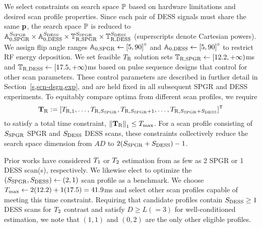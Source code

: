 We select constraints 
on search space $\mathbb{P}$ based 
on hardware limitations 
and desired scan profile properties. 
Since each pair of DESS signals 
must share the same $\mathbf{p}$, 
the search space $\mathbb{P}$ is reduced to 
$\mathbb{A}_{0,\mathrm{SPGR}}^{S_{\mathrm{SPGR}}} \times \mathbb{A}_{0,\mathrm{DESS}}^{S_{\mathrm{DESS}}} \times \mathbb{T}_{\mathrm{R,SPGR}}^{S_{\mathrm{SPGR}}} \times \mathbb{T}_{\mathrm{R,DESS}}^{S_{\mathrm{DESS}}}$ 
(superscripts denote Cartesian powers). 
We assign flip angle ranges 
$\setAs \gets \brac{5, 90}^\circ$ 
and $\setAd \gets \brac{5, 90}^\circ$
to restrict RF energy deposition. 
We set feasible $T_\mathrm{R}$ solution sets 
$\mathbb{T}_{\mathrm{R,SPGR}} \gets [12.2, +\infty)$ms 
and $\mathbb{T}_{\mathrm{R,DESS}} \gets [17.5, +\infty)$ms 
based on pulse sequence designs 
that control for other scan parameters. 
These control parameters are described 
in further detail in Section~\ref{s,scn-dsgn,exp}, 
and are held fixed 
in all subsequent SPGR and DESS experiments. 
To equitably compare optima 
from different scan profiles, 
we require 
$$\mathbf{T}_\mathrm{R} := [T_{\mathrm{R},1}, \dots, T_{\mathrm{R},{S_{\mathrm{SPGR}}}}, 
T_{\mathrm{R},{S_{\mathrm{SPGR}}}+1}, \dots, T_{\mathrm{R},{S_{\mathrm{SPGR}} + S_{\mathrm{DESS}}}}]^{\mathsf{T}}$$ 
to satisfy a total time constraint, 
$\norm{\bmTR}_1 \le \Tmax$. 
For a scan profile consisting 
of $S_{\mathrm{SPGR}}$ SPGR and $S_{\mathrm{DESS}}$ DESS scans, 
these constraints collectively reduce the search space dimension 
from $AD$ to $2(S_{\mathrm{SPGR}} + S_{\mathrm{DESS}}) -1$. 

Prior works have considered $T_1$ or $T_2$ estimation 
from as few as 2 SPGR 
\cite{wang:87:otp, deoni:03:rct} 
or 1 DESS \cite{welsch:09:reo} scan(s), 
respectively. 
We likewise elect to optimize 
the $(S_{\mathrm{SPGR}}, S_{\mathrm{DESS}}) \gets (2,1)$ scan profile 
as a benchmark. 
We choose $T_\mathrm{max} \gets 2(12.2) + 1(17.5) = 41.9$ms 
and select other scan profiles capable 
of meeting this time constraint. 
Requiring that candidate profiles contain $S_{\mathrm{DESS}} \ge 1$ DESS scans 
for $T_2$ contrast and satisfy $D \ge L (=3)$ 
for well-conditioned estimation, 
we note that $(1,1)$ and $(0,2)$ 
are the only other eligible profiles. 

